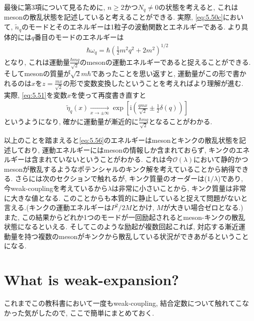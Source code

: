 \documentclass[dvipdfmx,11pt,a4paper,oneside,openany]{jsbook}
\begin{document}
最後に第3項について見るために, $n\geq2$かつ$N_q\neq0$の状態を考えると, これはmesonの散乱状態を記述していると考えることができる. 実際, \eqref{eq:5.50c}において, $\tilde{n}_q$のモードとそのエネルギーは1粒子の波動関数とエネルギーである. より具体的には$q$番目のモードのエネルギーは
\begin{align*}
    \hbar \omega_{q}=\hbar\left(\frac{1}{2} m^{2} q^{2}+2 m^{2}\right)^{1 / 2}
\end{align*}
となり, これは運動量$\frac{\hbar mq}{\sqrt{2}}$のmesonの運動エネルギーであると捉えることができる.そしてmesonの質量が$\sqrt{2}m\hbar$であったことを思い返すと, 運動量がこの形で書かれるのは$x$を$z=\frac{mx}{\sqrt{2}}$の形で変数変換したということを考えればより理解が進む. 実際, \eqref{eq:5.51}を変数$x$を使って再度書き直すと
\begin{align*}
    \tilde{\eta}_{q}(x) \underset{x \rightarrow \pm \infty}{\longrightarrow} \exp \left[\mathrm{i}\left(\frac{qmx}{\sqrt{2}} \pm \frac{1}{2} \delta(q)\right)\right]
\end{align*}
というようになり, 確かに運動量が漸近的に$\frac{\hbar mq}{\sqrt{2}}$となることがわかる.

以上のことを踏まえると\eqref{eq:5.56}のエネルギーはmesonとキンクの散乱状態を記述しており, 運動エネルギーにはmesonの情報しか含まれておらず, キンクのエネルギーは含まれていないということがわかる. これは今$\mathcal{O}(\lambda)$において静的かつmesonが散乱するようなポテンシャルのキンク解を考えていることから納得できる. さらには次のセクションで触れるが, キンク質量のオーダーは($1/\lambda$)であり, 今weak-couplingを考えているから$\lambda$は非常に小さいことから, キンク質量は非常に大きな値となる. このことからも本質的に静止していると捉えて問題がないと言える.(キンクの運動エネルギーは$P^2/2M$とかけ, $M$が大きい場合ゼロとなる.) また, この結果からどれか1つのモードが一回励起されるとmeson-キンクの散乱状態になるといえる. そしてこのような励起が複数回起これば, 対応する漸近運動量を持つ複数のmesonがキンクから散乱している状況ができあがるということになる.

\newpage

\appendix
\def\thesection{Appendix \Alph{section}}
\section{What is weak-expansion?}
これまでこの教科書において一度もweak-coupling, 結合定数について触れてこなかった気がしたので, ここで簡単にまとめておく.
\end{document}
